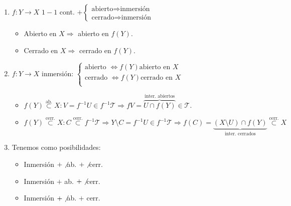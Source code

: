 \begin{obs}
\begin{enumerate}
    \item $f: Y \rightarrow X$ $1-1$ cont. $+ \begin{cases}
        \text{abierto} \Rightarrow \text{inmersión }\\
        \text{cerrado} \Rightarrow \text{inmersión } 
    \end{cases}$
    \begin{demo}
        \begin{itemize}
            \item Abierto en $X \Rightarrow$ abierto en $f\left( Y \right)$.
            \item Cerrado en $X \Rightarrow$ cerrado en $f\left( Y \right)$.
        \end{itemize}
    \end{demo}

    \item $f: Y \rightarrow X$ inmersión: $\begin{cases}
        \text{abierto } \Leftrightarrow f\left( Y \right) \text{abierto en } X\\
        \text{cerrado } \Leftrightarrow f\left( Y \right) \text{cerrado en } X\\
    \end{cases}$
    \begin{demo}
    \begin{itemize}
        \item 
        $f\left( Y \right) \stackrel{\text{ab.}}{\subset} X: V = f^{-1}U \in f^{-1}\mathcal{T} \Rightarrow fV = \overbrace{U \cap f\left( Y \right)}^{\text{inter. abiertos}} \in \mathcal{T}$.
        \item 
        $f\left( Y \right) \stackrel{\text{cerr.}}{\subset} X: C \stackrel{\text{cerr.}}{\subset}  f^{-1}\mathcal{T} \Rightarrow Y\setminus C = f^{-1} U \in f^{-1}\mathcal{T} \Rightarrow f\left( C \right) = \underbrace{\left( X\setminus U \right) \cap f\left( Y \right)}_{\text{inter. cerrados}}  \stackrel{\text{cerr.}}{\subset} X$ 
    \end{itemize} 
    \end{demo}

    \item Tenemos como posibilidades: 
    \begin{itemize}
        \item Inmersión $ + \not$ ab. $+ \not$ cerr.
        \item Inmersión $+$ ab. $+ \not $ cerr.
        \item Inmersión $+ \not$ ab. $+$ cerr.
    \end{itemize}
\end{enumerate}
\end{obs}

